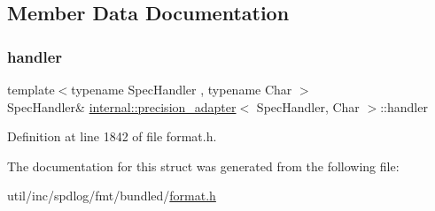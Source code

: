 \subsection{Member Data Documentation}
\mbox{\label{structinternal_1_1precision__adapter_ad82984ec771924019a6df49aff881f67}} 
\subsubsection{\texorpdfstring{handler}{handler}}
{\footnotesize\ttfamily template$<$typename Spec\+Handler , typename Char $>$ \\
Spec\+Handler\& \hyperlink{structinternal_1_1precision__adapter}{internal\+::precision\+\_\+adapter}$<$ Spec\+Handler, Char $>$\+::handler}



Definition at line 1842 of file format.\+h.



The documentation for this struct was generated from the following file\+:\begin{DoxyCompactItemize}
\item 
util/inc/spdlog/fmt/bundled/\hyperlink{format_8h}{format.\+h}\end{DoxyCompactItemize}
